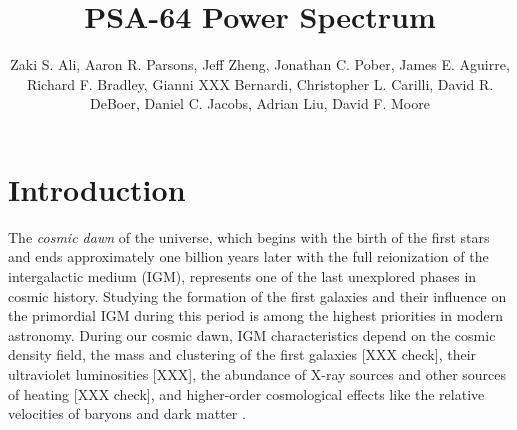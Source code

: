 \documentclass[twocolumn,numberedappendix]{emulateapj} \shorttitle{PSA64}
\begin{document}
 \title{PSA-64 Power Spectrum}

\author{ Zaki S. Ali, Aaron R. Parsons, Jeff
Zheng, Jonathan C. Pober, James E. Aguirre,
Richard F. Bradley, Gianni XXX Bernardi, Christopher L. Carilli,
David R. DeBoer, Daniel C. Jacobs, Adrian
Liu, David F. Moore
}


\begin{abstract} \end{abstract}


\section{Introduction}

The {\it cosmic dawn} of the universe, which begins with the birth of the first stars and ends approximately
one billion years later with the full
reionization of the intergalactic medium (IGM), represents one of the last 
unexplored phases in cosmic history. 
Studying the formation of the first galaxies and their influence on the primordial IGM during this
period is among the highest priorities in modern astronomy.
During our cosmic dawn, IGM characteristics depend on the cosmic density field, the mass and clustering of 
the first galaxies \citep{lidz_et_al2008} [XXX check], their ultraviolet luminosities [XXX],
the abundance of X-ray sources and other sources of heating \citep{messinger_et_al2013} [XXX check],
and higher-order cosmological effects like the relative velocities of baryons and dark matter \citep{visbal_et_al2012}.
\end{document}
